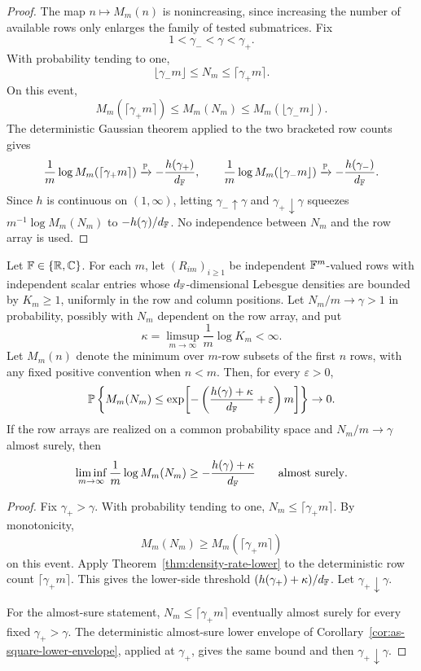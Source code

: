 \begin{proof}
The map \(n\mapsto M_m(n)\) is nonincreasing, since increasing the number of
available rows only enlarges the family of tested submatrices.  Fix
\[
  1<\gamma_-<\gamma<\gamma_+ .
\]
With probability tending to one,
\[
  \lfloor\gamma_-m\rfloor\le N_m\le\lceil\gamma_+m\rceil .
\]
On this event,
\[
  M_m(\lceil\gamma_+m\rceil)\le M_m(N_m)\le M_m(\lfloor\gamma_-m\rfloor).
\]
The deterministic Gaussian theorem applied to the two bracketed row counts
gives
\[
  \frac1m\log M_m(\lceil\gamma_+m\rceil)\xrightarrow{\mathbb{P}}
  -\frac{h(\gamma_+)}{d_{\mathbb{F}}},
  \qquad
  \frac1m\log M_m(\lfloor\gamma_-m\rfloor)\xrightarrow{\mathbb{P}}
  -\frac{h(\gamma_-)}{d_{\mathbb{F}}}.
\]
Since \(h\) is continuous on \((1,\infty)\), letting
\(\gamma_-\uparrow\gamma\) and \(\gamma_+\downarrow\gamma\) squeezes
\(m^{-1}\log M_m(N_m)\) to \(-h(\gamma)/d_{\mathbb{F}}\).  No independence between
\(N_m\) and the row array is used.
\end{proof}

\begin{corollary}\label{cor:random-row-count-bd}
Let \(\mathbb{F}\in\{\mathbb{R},\mathbb{C}\}\).  For each \(m\), let \((R_{im})_{i\ge1}\) be independent
\(\mathbb{F}^m\)-valued rows with independent scalar entries whose \(d_{\mathbb{F}}\)-dimensional
Lebesgue densities are bounded by \(K_m\ge1\), uniformly in the row and column
positions.  Let \(N_m/m\to\gamma>1\) in probability, possibly with \(N_m\)
dependent on the row array, and put
\[
  \kappa=\limsup_{m\to\infty}\frac1m\log K_m<\infty .
\]
Let \(M_m(n)\) denote the minimum over \(m\)-row subsets of the first \(n\) rows,
with any fixed positive convention when \(n<m\).  Then, for every
\(\varepsilon>0\),
\[
  \mathbb{P}\left\{M_m(N_m)\le
  \exp\!\left[-\left(\frac{h(\gamma)+\kappa}{d_{\mathbb{F}}}+\varepsilon\right)m\right]\right\}
  \to0 .
\]
If the row arrays are realized on a common probability space and
\(N_m/m\to\gamma\) almost surely, then
\[
  \liminf_{m\to\infty}\frac1m\log M_m(N_m)
  \ge-\frac{h(\gamma)+\kappa}{d_{\mathbb{F}}}
  \qquad\hbox{almost surely}.
\]
\end{corollary}

\begin{proof}
Fix \(\gamma_+>\gamma\).  With probability tending to one,
\(N_m\le\lceil\gamma_+m\rceil\).  By monotonicity,
\[
  M_m(N_m)\ge M_m(\lceil\gamma_+m\rceil)
\]
on this event.  Apply Theorem~\ref{thm:density-rate-lower} to the deterministic
row count \(\lceil\gamma_+m\rceil\).  This gives the lower-side threshold
\((h(\gamma_+)+\kappa)/d_{\mathbb{F}}\).  Let \(\gamma_+\downarrow\gamma\).

For the almost-sure statement, \(N_m\le\lceil\gamma_+m\rceil\) eventually almost
surely for every fixed \(\gamma_+>\gamma\).  The deterministic almost-sure
lower envelope of Corollary~\ref{cor:as-square-lower-envelope}, applied at
\(\gamma_+\), gives the same bound and then \(\gamma_+\downarrow\gamma\).
\end{proof}

